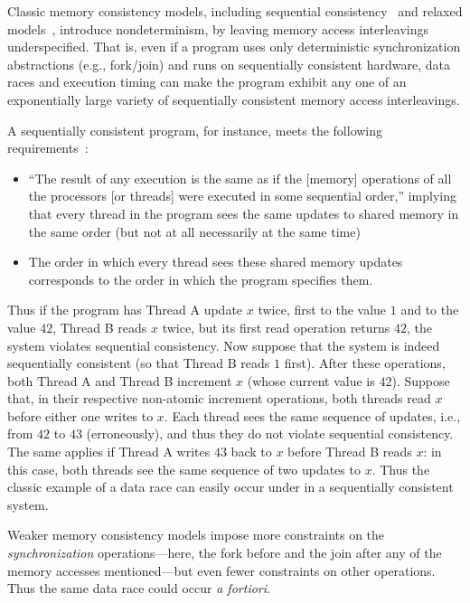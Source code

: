 Classic memory consistency models, including sequential 
consistency~\cite{lamport79multi,sezgin05sequential} and relaxed models~\cite{gharachorloo90memory, saraswat07memmodels}, introduce nondeterminism, by leaving memory access interleavings underspecified.  That is, even if a program uses only deterministic synchronization abstractions (e.g., fork/join) and runs on sequentially consistent hardware, data races and execution timing can make the program exhibit any one of an exponentially large variety of sequentially consistent memory access interleavings.

A sequentially consistent program, for instance, meets the following requirements~\cite{lamport79multi}:
\begin{itemize}
\item ``The result of any execution is the same as if the [memory] operations of all the processors [or threads] were executed in some sequential order,'' implying that every thread in the program sees the same updates to shared memory in the same order (but not at all necessarily at the same time)
\item The order in which every thread sees these shared memory updates corresponds to the order in which the program specifies them.
\end{itemize}
Thus if the program has Thread A update $x$ twice, first to the value $1$ and to the value $42$, Thread B reads $x$ twice, but its first read operation returns $42$, the system violates sequential consistency.  Now suppose that the system is indeed sequentially consistent (so that Thread B reads $1$ first).  After these operations, both Thread A and Thread B increment $x$ (whose current value is $42$).  Suppose that, in their respective non-atomic increment operations, both threads read $x$ before either one writes to $x$.  Each thread sees the same sequence of updates, i.e., from $42$ to $43$ (erroneously), and thus they do not violate sequential consistency.  The same applies if Thread A writes $43$ back to $x$ before Thread B reads $x$:  in this case, both threads see the same sequence of two updates to $x$.  Thus the classic example of a data race can easily occur under in a sequentially consistent system.

Weaker memory consistency models impose more constraints on the \textit{synchronization} operations---here, the fork before and the join after any of the memory accesses mentioned---but even fewer constraints on other operations.  Thus the same data race could occur \textit{a fortiori}.

